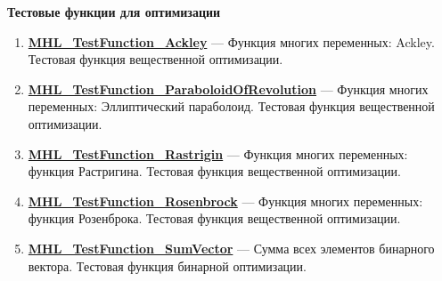 \documentclass[a4paper,12pt]{article}
\begin{document}
\textbf{Тестовые функции для оптимизации}
\begin{enumerate}

\item \textbf{\hyperref[MHL_TestFunction_Ackley]{MHL\_TestFunction\_Ackley}} --- Функция многих переменных: Ackley. Тестовая функция вещественной оптимизации.

\item \textbf{\hyperref[MHL_TestFunction_ParaboloidOfRevolution]{MHL\_TestFunction\_ParaboloidOfRevolution}} --- Функция многих переменных: Эллиптический параболоид. Тестовая функция вещественной оптимизации.

\item \textbf{\hyperref[MHL_TestFunction_Rastrigin]{MHL\_TestFunction\_Rastrigin}} --- Функция многих переменных: функция Растригина. Тестовая функция вещественной оптимизации.

\item \textbf{\hyperref[MHL_TestFunction_Rosenbrock]{MHL\_TestFunction\_Rosenbrock}} --- Функция многих переменных: функция Розенброка. Тестовая функция вещественной оптимизации.

\item \textbf{\hyperref[MHL_TestFunction_SumVector]{MHL\_TestFunction\_SumVector}} --- Сумма всех элементов бинарного вектора. Тестовая функция бинарной оптимизации.

\end{enumerate}
\end{document}
